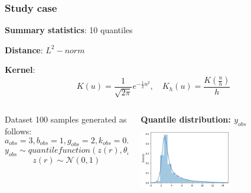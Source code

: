 \documentclass{beamer}
\begin{document}
	\begin{frame}
		\frametitle{Study case}
		
		\textbf{Summary statistics}: 10 quantiles
			
		\textbf{Distance}: $ L^2-norm $
			
		\textbf{Kernel}: 
		$$
		K(u) = 
		\frac{1}{\sqrt{2\pi}} e^{-\frac{1}{2}u^2}, 
		\quad K_h(u) 
		= \frac{K(\frac u h)}{h}
		$$
		
	\begin{columns}
		\begin{column}{0.6\textwidth}
		\begin{block}{Dataset}
			100 samples generated as follows:
			$$a_{obs}= 3 ,
			 b_{obs}= 1 ,
			 g_{obs}=2 ,
			 k_{obs}=0.5 $$
			$$ y_{obs} \sim quantilefunction(z(r), \theta_{obs})$$
			$$ z(r) \sim \mathcal{N}(0,1)$$
			
		\end{block}
		\end{column}
	\begin{column}{0.3\textwidth}
			
			\begin{center}
				{\scriptsize \textbf{Quantile distribution: $y_{obs}$}}
				\includegraphics[width=4cm,height=3cm]{immagini_mario/density_quantile}
			\end{center}
		\end{column}
	
	\end{columns}
		
	\end{frame}
\end{document}
